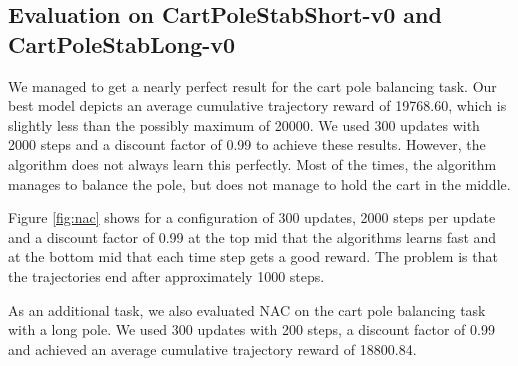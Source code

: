 \subsection{Evaluation on CartPoleStabShort-v0 and CartPoleStabLong-v0}

We managed to get a nearly perfect result for the cart pole balancing task. Our best model depicts an average cumulative trajectory reward of 19768.60, which is slightly less than the possibly maximum of 20000. We used 300 updates with 2000 steps and a discount factor of 0.99 to achieve these results. However, the algorithm does not always learn this perfectly. Most of the times, the algorithm manages to balance the pole, but does not manage to hold the cart in the middle. 

Figure \ref{fig:nac} shows for a configuration of 300 updates, 2000 steps per update and a discount factor of 0.99  at the top mid that the algorithms learns fast and at the bottom mid that each time step gets a good reward. The problem is that the trajectories end after approximately 1000 steps.

As an additional task, we also evaluated NAC on the cart pole balancing task with a long pole. We used 300 updates with 200 steps, a discount factor of 0.99 and achieved an average cumulative trajectory reward of 18800.84.

